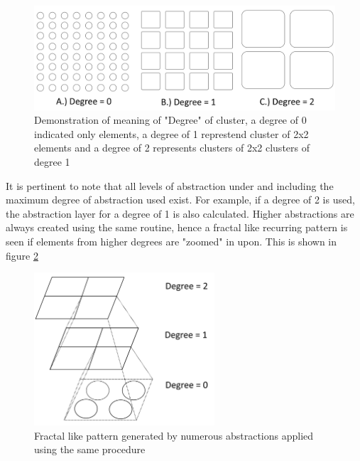 \begin{figure}[H]
\centering
\includegraphics[width=1.0\textwidth]{Figures/ClusterDegree.png}
\caption{\label{fig:CluserDegree} Demonstration of meaning of "Degree" of cluster, a degree of 0 indicated only elements, a degree of 1 represtend cluster of 2x2 elements and a degree of 2 represents clusters of 2x2 clusters of degree 1}
\end{figure} 

It is pertinent to note that all levels of abstraction under and including the maximum degree of abstraction used exist. For example, if a degree of 2 is used, the abstraction layer for a degree of 1 is also calculated. Higher abstractions are always created using the same routine, hence a fractal like recurring pattern is seen if elements from higher degrees are "zoomed" in upon. This is shown in figure \ref{fig:FractalPattern}

\begin{figure}[H]
\centering
\includegraphics[width=0.6\textwidth]{Figures/FractalPattern.png}
\caption{\label{fig:FractalPattern} Fractal like pattern generated by numerous abstractions applied using the same procedure}
\end{figure} 


